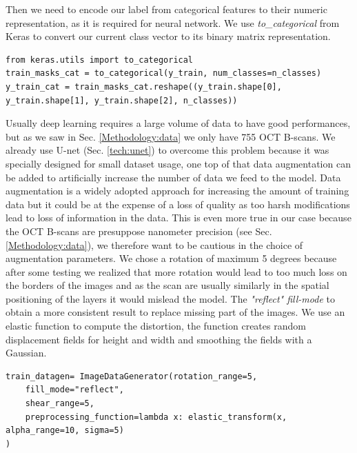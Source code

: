 \documentclass[12pt,a4paper]{scrartcl}
\begin{document}
Then we need to encode our label from categorical features to their numeric representation, as it is required for neural network. We use \emph{to\_categorical} from Keras \cite{chollet2015keras} to convert our current class vector to its binary matrix representation.

\begin{lstlisting}[caption={Data conversion into categorical, code belongs in the \emph{train.py} file}, label={lst:data-categorical}]
from keras.utils import to_categorical
train_masks_cat = to_categorical(y_train, num_classes=n_classes)
y_train_cat = train_masks_cat.reshape((y_train.shape[0], y_train.shape[1], y_train.shape[2], n_classes))
\end{lstlisting}

Usually deep learning requires a large volume of data to have good performances, but as we saw in Sec. \ref{Methodology:data} we only have 755 OCT B-scans. We already use U-net (Sec. \ref{tech:unet}) to overcome this problem because it was specially designed for small dataset usage, one top of that data augmentation can be added to artificially increase the number of data we feed to the model. Data augmentation is a widely adopted approach for increasing the amount of training data \cite{AugAndEval:2017} but it could be at the expense of a loss of quality as too harsh modifications lead to loss of information in the data. This is even more true in our case because the OCT B-scans are presuppose nanometer precision (see Sec. \ref{Methodology:data}), we therefore want to be cautious in the choice of augmentation parameters.
We chose a rotation of maximum 5 degrees because after some testing we realized that more rotation would lead to too much loss on the borders of the images and as the scan are usually similarly in the spatial positioning of the layers it would mislead the model. The \emph{"reflect" fill-mode} to obtain a more consistent result to replace missing part of the images. We use an elastic function to compute the distortion, the function creates random displacement fields for height and width and smoothing the fields with a Gaussian. 
\begin{lstlisting}[caption={Base generator for image augmentation, the definition of the 2 seperate generator (image and mask) can be found in \emph{train.py}}]
train_datagen= ImageDataGenerator(rotation_range=5,
    fill_mode="reflect",
    shear_range=5,
    preprocessing_function=lambda x: elastic_transform(x, alpha_range=10, sigma=5)
)
\end{lstlisting}
\end{document}
